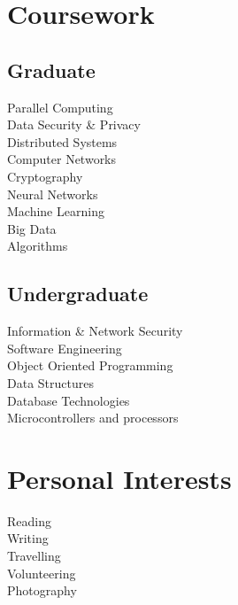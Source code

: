 \documentclass[]{main}
\begin{document}
\newpage

\begin{minipage}[t]{0.25\textwidth} 


\section{Coursework}

\subsection{Graduate}
\sectionsep
Parallel Computing\\
Data Security \& Privacy\\
Distributed Systems\\
Computer Networks\\
Cryptography\\
Neural Networks\\
Machine Learning\\
Big Data\\
Algorithms\\
\sectionsep

\subsection{Undergraduate}
\sectionsep
Information \& Network Security\\
Software Engineering\\
Object Oriented Programming\\
Data Structures\\
Database Technologies\\
Microcontrollers and processors\\
\sectionsep


\section{Personal Interests}\sectionsep
Reading\\
Writing\\
Travelling\\
Volunteering\\
Photography\\



\end{minipage} 
\end{document}
